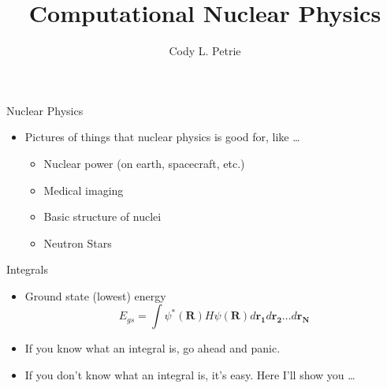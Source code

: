 \documentclass{beamer}
\title{Computational Nuclear Physics}
\author{Cody L. Petrie}
\institute{Arizona State University \\ Tempe, AZ}
\date{}
\begin{document}
\begin{frame}
   \titlepage
\end{frame}

\begin{frame}{Nuclear Physics}
\begin{itemize}
   \item Pictures of things that nuclear physics is good for, like \ldots
   \begin{itemize}
      \item Nuclear power (on earth, spacecraft, etc.)
      \item Medical imaging
      \item Basic structure of nuclei
      \item Neutron Stars
   \end{itemize}
\end{itemize}
\end{frame}

\begin{frame}{Integrals}
\begin{itemize}
   \item Ground state (lowest) energy
   \begin{equation*}
      E_{gs} = \int \psi^*(\mathbf{R})H\psi(\mathbf{R}) d\mathbf{r_1}d\mathbf{r_2}\ldots d\mathbf{r_N}
   \end{equation*}
   \item<2-> If you know what an integral is, go ahead and panic.
   \item<3-> If you don't know what an integral is, it's easy. Here I'll show you \ldots
\end{itemize}
\end{frame}
\end{document}
